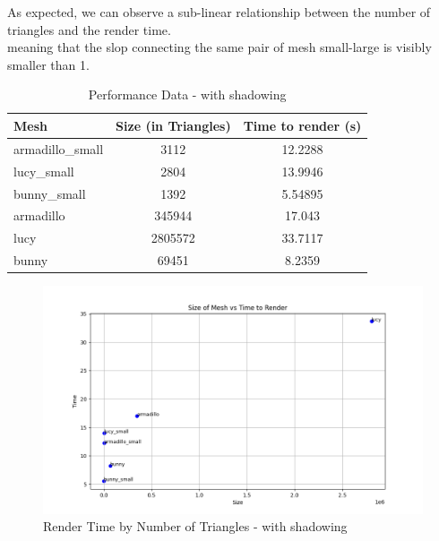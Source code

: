 \documentclass{article}
\begin{document}
As expected, we can observe a sub-linear relationship between the number of triangles and the render time.\\
meaning that the slop connecting the same pair of mesh small-large is visibly smaller than 1.\\

\begin{table}[h]
  \centering
  \caption{Performance Data - with shadowing}
  \label{tab:shadow}
  \begin{tabular}{lcc}
    \toprule
    \textbf{Mesh}    & \textbf{Size (in Triangles)} & \textbf{Time to render (s)} \\
    \midrule
    armadillo\_small & 3112                         & 12.2288                     \\
    lucy\_small      & 2804                         & 13.9946                     \\
    bunny\_small     & 1392                         & 5.54895                     \\
    armadillo        & 345944                       & 17.043                      \\
    lucy             & 2805572                      & 33.7117                     \\
    bunny            & 69451                        & 8.2359                      \\
    \bottomrule
  \end{tabular}
\end{table}


\begin{figure}[H]
  \caption{Render Time by Number of Triangles - with shadowing}
  \includegraphics[width=\linewidth, trim={3cm 0cm 3cm 0cm, clip}]{Figure_2.png}
\end{figure}
\end{document}
